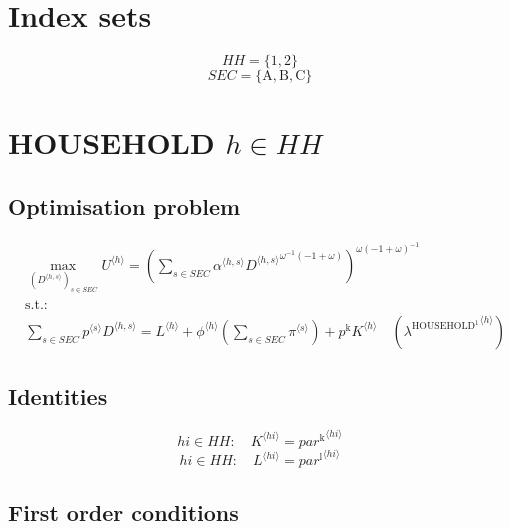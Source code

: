 

\section*{Index sets}

$${H\!H} = \{ \mathrm{1}, \mathrm{2} \}$$
$${S\!E\!C} = \{ \mathrm{A}, \mathrm{B}, \mathrm{C} \}$$

\section{HOUSEHOLD $h\in {H\!H}$}

\subsection{Optimisation problem}

\begin{align}
&\max_{\left({D}^{\langle h,s\rangle}\right)_{s\in {S\!E\!C}}
} {U}^{\langle h\rangle} = \left(\sum_{s\in {S\!E\!C}} {{\alpha}^{\langle h,s\rangle}} {{{D}^{\langle h,s\rangle}}^{{\omega}^{-1} \left(-1 + \omega\right)}}\right)^{{\omega} \left(-1 + \omega\right)^{-1}}\\
&\mathrm{s.t.:}\nonumber\\
& \sum_{s\in {S\!E\!C}} {{p}^{\langle s\rangle}} {{D}^{\langle h,s\rangle}} = {L}^{\langle h\rangle} + {{\phi}^{\langle h\rangle}} \left(\sum_{s\in {S\!E\!C}} {\pi}^{\langle s\rangle}\right) + {p^{\mathrm{k}}} {{K}^{\langle h\rangle}} \quad \left({\lambda^{\mathrm{HOUSEHOLD}^{\mathrm{1}}}}^{\langle h\rangle}\right)
\end{align}


\subsection{Identities}

\begin{equation}
{h\!i}\in {H\!H}\colon\quad {K}^{\langle {h\!i}\rangle} = {{p\!a\!r}^{\mathrm{k}}}^{\langle {h\!i}\rangle}
\end{equation}
\begin{equation}
{h\!i}\in {H\!H}\colon\quad {L}^{\langle {h\!i}\rangle} = {{p\!a\!r}^{\mathrm{l}}}^{\langle {h\!i}\rangle}
\end{equation}


\subsection{First order conditions}

